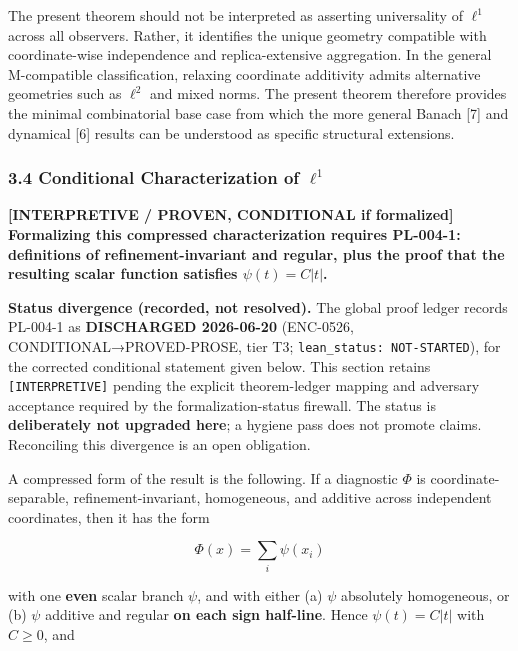 \documentclass[
  11pt,
]{article}
\renewenvironment{quote}
  {\begin{leftbar}\small}
  {\end{leftbar}}
\begin{document}
The present theorem should not be interpreted as asserting universality
of \(\ell^1\) across all observers. Rather, it identifies the unique
geometry compatible with coordinate-wise independence and
replica-extensive aggregation. In the general M-compatible
classification, relaxing coordinate additivity admits alternative
geometries such as \(\ell^2\) and mixed norms. The present theorem
therefore provides the minimal combinatorial base case from which the
more general Banach {[}7{]} and dynamical {[}6{]} results can be
understood as specific structural extensions.

\hypertarget{conditional-characterization-of-ell1}{%
\subsubsection{\texorpdfstring{3.4 Conditional Characterization of
\(\ell^1\)}{3.4 Conditional Characterization of \textbackslash ell\^{}1}}\label{conditional-characterization-of-ell1}}

\textbf{{[}INTERPRETIVE / PROVEN, CONDITIONAL if formalized{]}
Formalizing this compressed characterization requires PL-004-1:
definitions of refinement-invariant and regular, plus the proof that the
resulting scalar function satisfies \(\psi(t)=C|t|\).}

\begin{quote}
\textbf{Status divergence (recorded, not resolved).} The global proof
ledger records PL-004-1 as \textbf{DISCHARGED 2026-06-20} (ENC-0526,
CONDITIONAL→PROVED-PROSE, tier T3;
\texttt{lean\_\allowbreak{}status: NOT-\allowbreak{}STARTED}), for the
corrected conditional statement given below. This section retains
\texttt{[INTERPRETIVE]} pending the explicit theorem-ledger mapping and
adversary acceptance required by the formalization-status firewall. The
status is \textbf{deliberately not upgraded here}; a hygiene pass does
not promote claims. Reconciling this divergence is an open obligation.
\end{quote}

A compressed form of the result is the following. If a diagnostic
\(\Phi\) is coordinate-separable, refinement-invariant, homogeneous, and
additive across independent coordinates, then it has the form

\[
\Phi(x)=\sum_i \psi(x_i)
\]

with one \textbf{even} scalar branch \(\psi\), and with either (a)
\(\psi\) absolutely homogeneous, or (b) \(\psi\) additive and regular
\textbf{on each sign half-line}. Hence \(\psi(t)=C|t|\) with \(C\ge0\),
and
\end{document}
